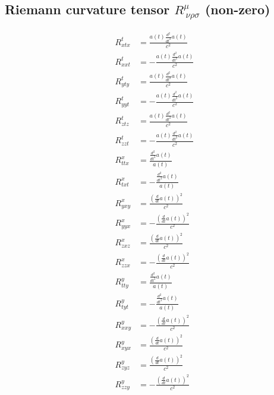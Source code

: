 \documentclass{article}
\begin{document}
\subsection{Riemann curvature tensor $R^{\mu}_{\ \nu\rho\sigma}$ (non-zero)}
\begin{align}
R^{t}_{x t x} &= \frac{a{\left(t \right)} \frac{d^{2}}{d t^{2}} a{\left(t \right)}}{c^{2}} \\
R^{t}_{x x t} &= - \frac{a{\left(t \right)} \frac{d^{2}}{d t^{2}} a{\left(t \right)}}{c^{2}} \\
R^{t}_{y t y} &= \frac{a{\left(t \right)} \frac{d^{2}}{d t^{2}} a{\left(t \right)}}{c^{2}} \\
R^{t}_{y y t} &= - \frac{a{\left(t \right)} \frac{d^{2}}{d t^{2}} a{\left(t \right)}}{c^{2}} \\
R^{t}_{z t z} &= \frac{a{\left(t \right)} \frac{d^{2}}{d t^{2}} a{\left(t \right)}}{c^{2}} \\
R^{t}_{z z t} &= - \frac{a{\left(t \right)} \frac{d^{2}}{d t^{2}} a{\left(t \right)}}{c^{2}} \\
R^{x}_{t t x} &= \frac{\frac{d^{2}}{d t^{2}} a{\left(t \right)}}{a{\left(t \right)}} \\
R^{x}_{t x t} &= - \frac{\frac{d^{2}}{d t^{2}} a{\left(t \right)}}{a{\left(t \right)}} \\
R^{x}_{y x y} &= \frac{\left(\frac{d}{d t} a{\left(t \right)}\right)^{2}}{c^{2}} \\
R^{x}_{y y x} &= - \frac{\left(\frac{d}{d t} a{\left(t \right)}\right)^{2}}{c^{2}} \\
R^{x}_{z x z} &= \frac{\left(\frac{d}{d t} a{\left(t \right)}\right)^{2}}{c^{2}} \\
R^{x}_{z z x} &= - \frac{\left(\frac{d}{d t} a{\left(t \right)}\right)^{2}}{c^{2}} \\
R^{y}_{t t y} &= \frac{\frac{d^{2}}{d t^{2}} a{\left(t \right)}}{a{\left(t \right)}} \\
R^{y}_{t y t} &= - \frac{\frac{d^{2}}{d t^{2}} a{\left(t \right)}}{a{\left(t \right)}} \\
R^{y}_{x x y} &= - \frac{\left(\frac{d}{d t} a{\left(t \right)}\right)^{2}}{c^{2}} \\
R^{y}_{x y x} &= \frac{\left(\frac{d}{d t} a{\left(t \right)}\right)^{2}}{c^{2}} \\
R^{y}_{z y z} &= \frac{\left(\frac{d}{d t} a{\left(t \right)}\right)^{2}}{c^{2}} \\
R^{y}_{z z y} &= - \frac{\left(\frac{d}{d t} a{\left(t \right)}\right)^{2}}{c^{2}} \\

\end{align}
\end{document}
